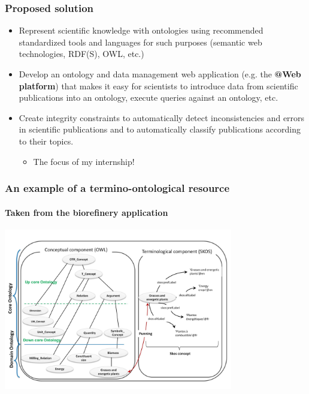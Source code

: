 \documentclass{beamer}
\begin{document}
\begin{frame}
  \frametitle{Proposed solution}

  \begin{itemize}
    \item Represent scientific knowledge with ontologies using recommended
      standardized tools and languages for such purposes (semantic web
      technologies, RDF(S), OWL, etc.)

    \pause

    \item Develop an ontology and data management web application (e.g. the
      \textbf{@Web platform}) that makes it easy for scientists to introduce
      data from scientific publications into an ontology, execute queries
      against an ontology, etc.

    \pause

    \item Create integrity constraints to automatically detect inconsistencies
      and errors in scientific publications and to automatically classify
      publications according to their topics.

    \pause

    \begin{itemize}
      \item The focus of my internship!
    \end{itemize}

  \end{itemize}
\end{frame}

\begin{frame}
  \frametitle{An example of a termino-ontological resource}
  \framesubtitle{Taken from the biorefinery application}

  \begin{center}
    \includegraphics[width=10cm]{termino-ontological-resource.jpg}
  \end{center}
\end{frame}
\end{document}
